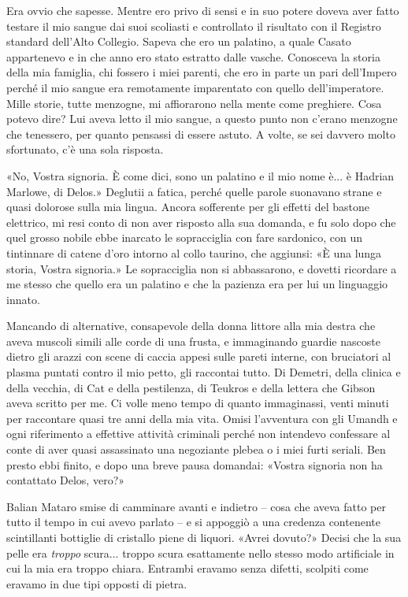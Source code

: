 Era ovvio che sapesse. Mentre ero privo di sensi e in suo potere doveva
aver fatto testare il mio sangue dai suoi scoliasti e controllato il
risultato con il Registro standard dell'Alto Collegio. Sapeva che ero un
palatino, a quale Casato appartenevo e in che anno ero stato estratto
dalle vasche. Conosceva la storia della mia famiglia, chi fossero i miei
parenti, che ero in parte un pari dell'Impero perché il mio sangue era
remotamente imparentato con quello dell'imperatore. Mille storie, tutte
menzogne, mi affiorarono nella mente come preghiere. Cosa potevo dire?
Lui aveva letto il mio sangue, a questo punto non c'erano menzogne che
tenessero, per quanto pensassi di essere astuto. A volte, se sei davvero
molto sfortunato, c'è una sola risposta.

«No, Vostra signoria. È come dici, sono un palatino e il mio nome è... è
Hadrian Marlowe, di Delos.» Deglutii a fatica, perché quelle parole
suonavano strane e quasi dolorose sulla mia lingua. Ancora sofferente
per gli effetti del bastone elettrico, mi resi conto di non aver
risposto alla sua domanda, e fu solo dopo che quel grosso nobile ebbe
inarcato le sopracciglia con fare sardonico, con un tintinnare di catene
d'oro intorno al collo taurino, che aggiunsi: «È una lunga storia,
Vostra signoria.» Le sopracciglia non si abbassarono, e dovetti
ricordare a me stesso che quello era un palatino e che la pazienza era
per lui un linguaggio innato.

Mancando di alternative, consapevole della donna littore alla mia destra
che aveva muscoli simili alle corde di una frusta, e immaginando guardie
nascoste dietro gli arazzi con scene di caccia appesi sulle pareti
interne, con bruciatori al plasma puntati contro il mio petto, gli
raccontai tutto. Di Demetri, della clinica e della vecchia, di Cat e
della pestilenza, di Teukros e della lettera che Gibson aveva scritto
per me. Ci volle meno tempo di quanto immaginassi, venti minuti per
raccontare quasi tre anni della mia vita. Omisi l'avventura con gli
Umandh e ogni riferimento a effettive attività criminali perché non
intendevo confessare al conte di aver quasi assassinato una negoziante
plebea o i miei furti seriali. Ben presto ebbi finito, e dopo una breve
pausa domandai: «Vostra signoria non ha contattato Delos, vero?»

Balian Mataro smise di camminare avanti e indietro -- cosa che aveva
fatto per tutto il tempo in cui avevo parlato -- e si appoggiò a una
credenza contenente scintillanti bottiglie di cristallo piene di
liquori. «Avrei dovuto?» Decisi che la sua pelle era \emph{troppo}
scura... troppo scura esattamente nello stesso modo artificiale in cui
la mia era troppo chiara. Entrambi eravamo senza difetti, scolpiti come
eravamo in due tipi opposti di pietra.

